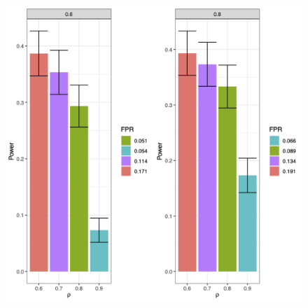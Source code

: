 \documentclass[10pt]{article}
\begin{document}
\begin{figure}[htbp]
\centering
\includegraphics[scale=.8]{Images/Supp/Greg/power_split.png}

\end{figure}
\end{document}

